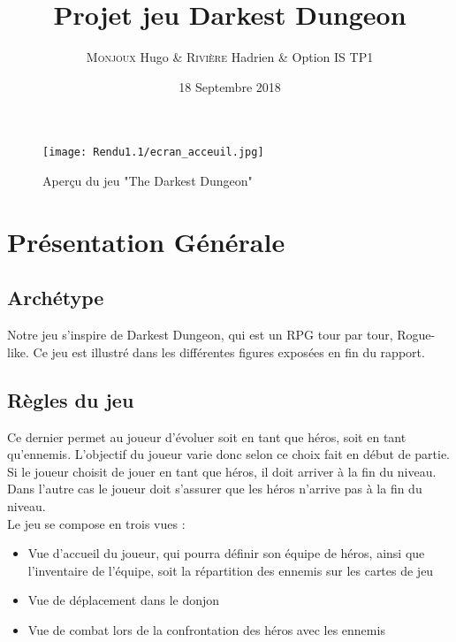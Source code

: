\documentclass[a4paper,12pt]{article}
\title{Projet jeu Darkest Dungeon}
\author{\textsc{Monjoux} Hugo & \textsc{Rivière} Hadrien & Option IS TP1}
\date{18 Septembre 2018}
\begin{document}
\maketitle
\begin{figure}[!ht]
  \centering
  \texttt{[image: Rendu1.1/ecran\_acceuil.jpg]}
  \caption{Aperçu du jeu "The Darkest Dungeon"}
\end{figure}

\newpage
\tableofcontents
\newpage
\section{Présentation Générale}
\subsection{Archétype}
Notre jeu s'inspire de Darkest Dungeon, qui est un RPG tour par tour, Rogue-like. Ce jeu est illustré dans les différentes figures exposées en fin du rapport. 

\subsection{Règles du jeu}

 Ce dernier permet au joueur d'évoluer soit en tant que héros, soit en tant qu'ennemis. L'objectif du joueur varie donc selon ce choix fait en début de partie. Si le joueur choisit de jouer en tant que héros, il doit arriver à la fin du niveau. Dans l'autre cas le joueur doit s'assurer que les héros n'arrive pas à la fin du niveau. 
\\ 
\indent
Le jeu se compose en trois vues : 
\begin{itemize}
    \item Vue d'accueil du joueur, qui pourra définir son équipe de héros, ainsi que l'inventaire de l'équipe, soit la répartition des ennemis sur les cartes de jeu
    \item Vue de déplacement dans le donjon
    \item Vue de combat lors de la confrontation des héros avec les ennemis
\end{itemize} 
\end{document}
